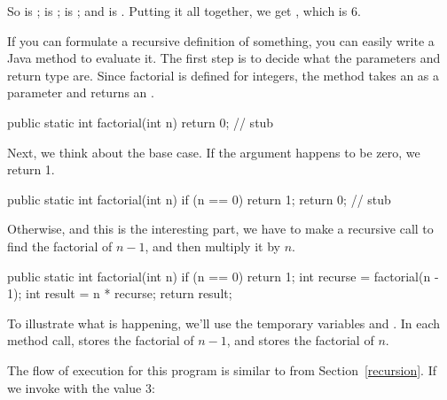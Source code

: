 So  is ;  is ;  is ; and  is .
Putting it all together, we get , which is 6.

If you can formulate a recursive definition of something, you can easily write a Java method to evaluate it.
The first step is to decide what the parameters and return type are.
Since factorial is defined for integers, the method takes an  as a parameter and returns an .

\begin{code}
public static int factorial(int n) {
    return 0;  // stub
}
\end{code}

Next, we think about the base case.
If the argument happens to be zero, we return 1.

\begin{code}
public static int factorial(int n) {
    if (n == 0) {
        return 1;
    }
    return 0;  // stub
}
\end{code}

Otherwise, and this is the interesting part, we have to make a recursive call to find the factorial of $n-1$, and then multiply it by $n$.

\begin{code}
public static int factorial(int n) {
    if (n == 0) {
        return 1;
    }
    int recurse = factorial(n - 1);
    int result = n * recurse;
    return result;
}
\end{code}

To illustrate what is happening, we'll use the temporary variables  and .
In each method call,  stores the factorial of $n - 1$, and  stores the factorial of $n$.

The flow of execution for this program is similar to  from Section~\ref{recursion}.
If we invoke  with the value 3:

